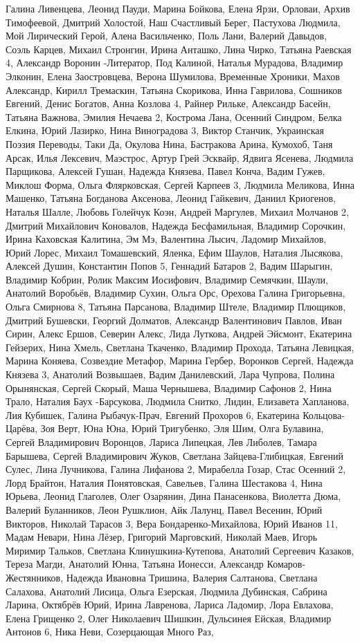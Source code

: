 Галина Ливенцева, Леонид Пауди, Марина Бойкова, Елена Ярзи, Орловаи, Архив Тимофеевой, Дмитрий Холостой, Наш Счастливый Берег, Пастухова Людмила, Мой Лирический Герой, Алена Васильченко, Поль Лани, Валерий Давыдов, Соэль Карцев, Михаил Стронгин, Ирина Анташко, Лина Чирко, Татьяна Раевская 4, Александр Воронин -Литератор, Под Калиной, Наталья Мурадова, Владимир Элконин, Елена Заостровцева, Верона Шумилова, Временные Хроники, Махов Александр, Кирилл Тремаскин, Татьяна Скорикова, Инна Гаврилова, Сошников Евгений, Денис Богатов, Анна Козлова 4, Райнер Рильке, Александр Басейн, Татьяна Важнова, Эмилия Нечаева 2, Кострома Лана, Осенний Синдром, Белка Елкина, Юрий Лазирко, Нина Виноградова 3, Виктор Станчик, Украинская Поэзия Переводы, Таки Да, Окулова Нина, Бастракова Арина, Кумохоб, Таня Арсак, Илья Лексевич, Маэстрос, Артур Грей Эсквайр, Ядвига Ясенева, Людмила Парщикова, Алексей Гушан, Надежда Князева, Павел Конча, Вадим Гужев, Миклош Форма, Ольга Флярковская, Сергей Карпеев 3, Людмила Меликова, Инна Машенко, Татьяна Богданова Аксенова, Леонид Гайкевич, Даниил Криогенов, Наталья Шалле, Любовь Голейчук Коэн, Андрей Маргулев, Михаил Молчанов 2, Дмитрий Михайлович Коновалов, Надежда Бесфамильная, Владимир Сорочкин, Ирина Каховская Калитина, Эм Мэ, Валентина Лысич, Ладомир Михайлов, Юрий Лорес, Михаил Томашевский, Яленка, Ефим Шаулов, Наталия Лысякова, Алексей Душин, Константин Попов 5, Геннадий Батаров 2, Вадим Шарыгин, Владимир Кобрин, Ролик Максим Иосифович, Владимир Семячкин, Шаули, Анатолий Воробьёв, Владимир Сухин, Ольга Орс, Орехова Галина Григорьевна, Ольга Смирнова 8, Татьяна Парсанова, Владимир Штеле, Владимир Плющиков, Дмитрий Бушевски, Георгий Долматов, Александр Валентинович Павлов, Иван Сирин, Алекс Ершов, Северин Алекс, Лида Луткова, Андрей Эйсмонт, Екатерина Гейзерих, Нина Хмель, Светлана Ткаченко, Владимир Прохода, Татьяна Левицкая, Марина Коняева, Созвездие Метафор, Марина Гербер, Воронков Сергей, Надежда Князева 3, Анатолий Возвышаев, Вадим Данилевский, Лара Чупрова, Полина Орынянская, Сергей Скорый, Маша Чернышева, Владимир Сафонов 2, Нина Трало, Наталия Баух -Барсукова, Людмила Снитко, Лидин, Елизавета Хапланова, Лия Кубишек, Галина Рыбачук-Прач, Евгений Прохоров 6, Екатерина Кольцова-Царёва, Зоя Верт, Юна Юна, Юрий Тригубенко, Эля Шим, Олга Булавина, Сергей Владимирович Воронцов, Лариса Липецкая, Лев Либолев, Тамара Барышева, Сергей Владимирович Жуков, Светлана Зайцева-Глибицкая, Евгений Сулес, Лина Лучникова, Галина Лифанова 2, Мирабелла Гозар, Стас Осенний 2, Лорд Брайтон, Наталия Понятовская, Савельев, Галина Шестакова 4, Нина Юрьева, Леонид Глаголев, Олег Озарянин, Дина Панасенкова, Виолетта Дюма, Валерий Буланников, Леон Рушклион, Айк Лалунц, Павел Весенин, Юрий Викторов, Николай Тарасов 3, Вера Бондаренко-Михайлова, Юрий Иванов 11, Мадам Невари, Нина Лёзер, Григорий Марговский, Николай Маев, Игорь Миримир Тальков, Светлана Клинушкина-Кутепова, Анатолий Сергеевич Казаков, Тереза Магди, Анатолий Юнна, Татьяна Ионесси, Александр Комаров-Жестянников, Надежда Ивановна Тришина, Валерия Салтанова, Светлана Салахова, Анатолий Лисица, Ольга Езерская, Людмила Дубинская, Сабрина Ларина, Октябрёв Юрий, Ирина Лавренова, Лариса Ладомир, Лора Евлахова, Елена Грищенко 2, Олег Николаевич Шишкин, Дульсинея Ейская, Владимир Антонов 6, Ника Неви, Созерцающая Много Раз, 